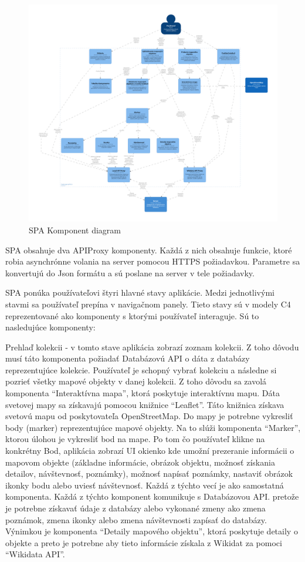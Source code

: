 \begin{figure}[h]
      \includegraphics[width=140mm]{../img/structurizr-SinglePageAplicationComponents}
      \caption{ SPA Komponent diagram}
\end{figure}

SPA obsahuje dva APIProxy komponenty. Každá z nich obsahuje funkcie, ktoré robia asynchrónne volania na server pomocou HTTPS požiadavkou.
Parametre sa konvertujú do Json formátu a sú poslane na server v tele požiadavky.

SPA ponúka používateľovi štyri hlavné stavy aplikácie. Medzi jednotlivými stavmi sa používateľ prepína v navigačnom panely.
Tieto stavy sú v modely C4 reprezentované ako komponenty s ktorými používateľ interaguje. Sú to nasledujúce komponenty:

Prehlaď kolekcii - v tomto stave aplikácia zobrazí zoznam kolekcii. Z toho dôvodu musí táto komponenta požiadať Databázovú API o dáta z databázy reprezentujúce kolekcie.
Používateľ je schopný vybrať kolekciu a následne si pozrieť všetky mapové objekty v danej kolekcii. Z toho dôvodu sa zavolá komponenta “Interaktívna mapa”, ktorá poskytuje
interaktívnu mapu. Dáta svetovej mapy sa získavajú pomocou knižnice “Leaflet”. Táto knižnica získava svetovú mapu od poskytovateľa OpenStreetMap.
Do mapy je potrebne vykresliť body (marker) reprezentujúce mapové objekty. Na to slúži komponenta “Marker”, ktorou úlohou je vykresliť bod na mape. Po tom čo používateľ klikne na konkrétny
Bod, aplikácia zobrazí UI okienko kde umožní prezeranie informácii o mapovom objekte (základne informácie, obrázok objektu, možnosť získania detailov, návštevnosť, poznámky),
možnosť napísať poznámky, nastaviť obrázok ikonky bodu alebo uviesť návštevnosť.
Každá z týchto vecí je ako samostatná komponenta. Každá z týchto komponent komunikuje s Databázovou API. pretože je potrebne získavať údaje z databázy alebo vykonané zmeny ako
zmena poznámok, zmena ikonky alebo zmena návštevnosti zapísať do databázy. Výnimkou je komponenta “Detaily mapového objektu”, ktorá poskytuje detaily o objekte a preto je potrebne aby
tieto informácie získala z Wikidat za pomoci “Wikidata API”.

